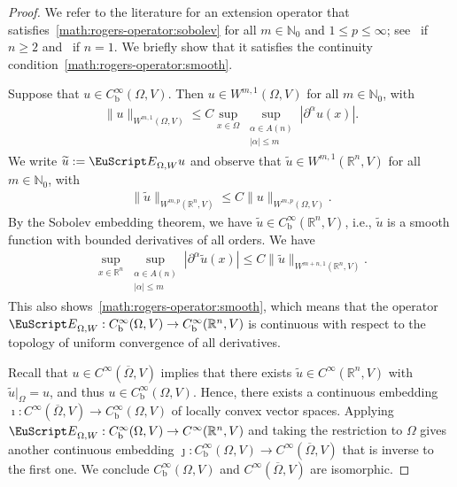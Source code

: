 \documentclass[10pt,a4paper]{amsart}
\theoremstyle{definition}
\theoremstyle{remark}
\numberwithin{equation}{section}
\newcommand{\bbN}{{\mathbb N}}
\newcommand{\bbR}{{\mathbb R}}
\newcommand{\euE}{{\EuScript E}}
\newcommand{\closure}{\overline}
\renewcommand{\restriction}{|}
\newcommand{\vecnorm}[1]{|#1|}
\newcommand{\Domain}{{\Omega}}
\newcommand{\Extension}{\euE}
\newcommand{\Wint}{W}
\newcommand{\VEC}{{V}}
\newcommand{\bounded}{\mathrm{b}}
\begin{document}
\begin{proof}
    We refer to the literature for an extension operator that satisfies~\eqref{math:rogers-operator:sobolev} for all $m \in \bbN_{0}$ and $1 \leq p \leq \infty$; see~\cite[Theorem~8]{rogers2006degree} if $n \geq 2$ and~\cite{seeley1964extension} if $n = 1$. We briefly show that it satisfies the continuity condition~\eqref{math:rogers-operator:smooth}.
    
    Suppose that $u \in C^{\infty}_{\bounded}(\Domain,\VEC)$.
    Then $u \in \Wint^{m,1}(\Domain,\VEC)$ for all $m \in \bbN_{0}$, with
    \begin{align*}
        \| u \|_{\Wint^{m,1}(\Domain,\VEC)} 
        \leq 
        C \sup_{ x \in \Domain } \sup_{ \substack{ \alpha \in A(n) \\ |\alpha| \leq m } } \vecnorm{ \partial^{\alpha} u(x) }
        .
    \end{align*}
    We write $\widetilde{u} := \Extension_{\Domain,W} u$ and observe that $\widetilde{u} \in \Wint^{m,1}(\bbR^{n},\VEC)$ for all $m \in \bbN_{0}$,
    with
    \begin{align*}
        \| \widetilde{u} \|_{\Wint^{m,p}(\bbR^{n},\VEC)} 
        \leq 
        C \| u \|_{\Wint^{m,p}(\Domain,\VEC)} 
        .
    \end{align*}
    By the Sobolev embedding theorem, we have $\widetilde{u} \in C^{\infty}_{\bounded}(\bbR^{n},\VEC)$,
    i.e., $\widetilde{u}$ is a smooth function with bounded derivatives of all orders. We have 
    \begin{align*}
        \sup_{ x \in \bbR^{n} } \sup_{ \substack{ \alpha \in A(n) \\ |\alpha| \leq m } } \vecnorm{ \partial^{\alpha} \widetilde{u}(x) } 
        \leq 
        C \| \widetilde{u} \|_{\Wint^{m+n,1}(\bbR^{n},\VEC)} 
        .
    \end{align*}
    This also shows~\eqref{math:rogers-operator:smooth}, which means that the operator $\Extension_{\Domain,W} : C^{\infty}_{\bounded}(\Domain,\VEC) \to C^{\infty}_{\bounded}(\bbR^{n},\VEC)$ is continuous with respect to the topology of uniform convergence of all derivatives.

    Recall that $u \in C^{\infty}(\closure\Domain,\VEC)$ implies that there exists $\widetilde{u} \in C^{\infty}(\bbR^{n},\VEC)$ with $\widetilde{u} \restriction_{\Domain} = u$, and thus $u \in C^{\infty}_{\bounded}(\Domain,\VEC)$. 
    Hence, there exists a continuous embedding $\imath : C^{\infty}(\closure\Domain,\VEC) \to C^{\infty}_{\bounded}(\Domain,\VEC)$ of locally convex vector spaces.
    Applying $\Extension_{\Domain,W} : C^{\infty}_{\bounded}(\Domain,\VEC) \to C^{\infty}(\bbR^{n},\VEC)$ and taking the restriction to $\Domain$ gives another continuous embedding 
    $\jmath : C^{\infty}_{\bounded}(\Domain,\VEC) \to C^{\infty}(\closure\Domain,\VEC)$ that is inverse to the first one.
    We conclude $C^{\infty}_{\bounded}(\Domain,\VEC)$ and $C^{\infty}(\closure\Domain,\VEC)$ are isomorphic.
\end{proof}
\end{document}
